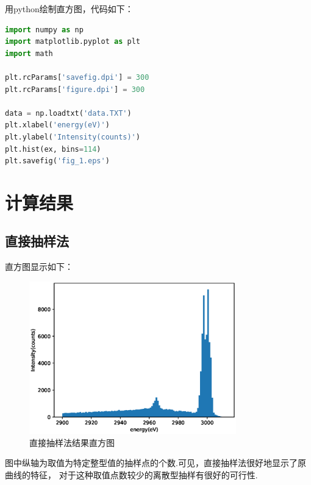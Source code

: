 \documentclass[12pt,a4paper,utf8]{ctexart}
\begin{document}
用python绘制直方图，代码如下：
\begin{framed}
\begin{lstlisting}[language=python]
import numpy as np
import matplotlib.pyplot as plt
import math

plt.rcParams['savefig.dpi'] = 300
plt.rcParams['figure.dpi'] = 300

data = np.loadtxt('data.TXT')
plt.xlabel('energy(eV)')
plt.ylabel('Intensity(counts)')
plt.hist(ex, bins=114)
plt.savefig('fig_1.eps')
\end{lstlisting}
\end{framed}

\section{计算结果}

\subsection{直接抽样法}

直方图显示如下：
\begin{figure}[htpb]
    \centering
    \includegraphics[width=0.8\textwidth]{fig_2.eps}
    \caption{直接抽样法结果直方图}
\end{figure}

图中纵轴为取值为特定整型值的抽样点的个数.可见，直接抽样法很好地显示了原曲线的特征，
对于这种取值点数较少的离散型抽样有很好的可行性.
\end{document}

